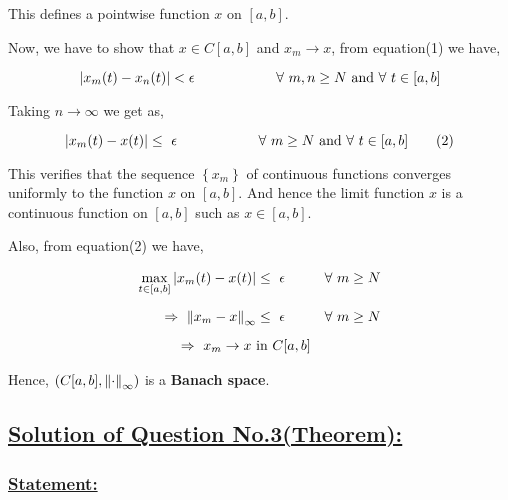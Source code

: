 \documentclass[a4paper,12pt]{article}
\begin{document}
    This defines a pointwise function $x$ on $[a,b]$.

    \vspace*{0.4cm}
    Now, we have to show that $x\in C[a,b]$ and $x_m\to x$, from equation(1) we have,

    \[|x_m(t) - x_n(t)| < \epsilon\, \hspace*{2cm} \forall\ m,n \geq N\ \mbox{and}\ \forall\ t\in [a,b] \]

    Taking $n\to \infty$ we get as,

    \begin{equation*}
        |x_m(t) - x(t)| \leq\  \epsilon\, \hspace*{2cm} \forall\ m \geq N\ \mbox{and}\ \forall\ t\in [a,b] \tag*{(2)}
    \end{equation*}

    This verifies that the sequence $\left\{x_m\right\}$ of continuous functions converges uniformly to the function $x$ on $[a,b]$. And hence the limit function $x$ is a continuous function on $[a,b]$ such as $x\in [a,b]$.

    Also, from equation(2) we have,

    \begin{equation*}
        \begin{split}
            \displaystyle \max_{t \in [a,b]} |x_m(t) - x(t)| & \leq\ \epsilon \hspace*{1cm} \forall\ m\geq N\\[2mm]
            \Rightarrow\ \norm{x_m -x}_{\infty} & \leq\ \epsilon \hspace*{1cm}\forall\ m \geq N\\[2mm]
            \Rightarrow\ x_m\to x\ & \mbox{in}\ C[a,b]
        \end{split}
    \end{equation*}

    Hence, $\left(C[a,b], \norm{\cdot}_{\infty}\right)$ is a {\bf Banach space}.\

    \pagebreak

    \subsection*{\underline{Solution of Question No.3(Theorem):}}

    \subsubsection*{\underline{{\bf Statement:}}}
\end{document}
